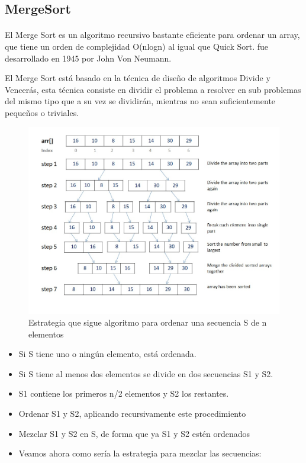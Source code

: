 \documentclass{article}
\begin{document}
     \subsection{MergeSort}
    \paragraph{}
    El Merge Sort es un algoritmo recursivo bastante eficiente para ordenar un array, que tiene un orden de complejidad O(nlogn) al igual que Quick Sort. fue desarrollado en 1945 por John Von Neumann.

    El Merge Sort está basado en la técnica de diseño de algoritmos Divide y Vencerás, esta técnica consiste en dividir el problema a resolver en sub problemas del mismo tipo que a su vez se dividirán, mientras no sean suficientemente  pequeños o triviales.
    \begin{figure}[h!]
        \centering
        \includegraphics[width=12cm]{img/mergesort.png}
        \caption{Estrategia que sigue algoritmo para ordenar una secuencia S de n elementos}
        \label{fig:mergesort}
    \end {figure}
    \begin{itemize}
        \item Si S tiene uno o ningún elemento, está ordenada.
        \item Si S tiene al menos dos elementos se divide en dos secuencias S1 y S2.
        \item S1 contiene los primeros n/2 elementos y S2 los restantes.
        \item Ordenar S1 y S2, aplicando recursivamente este procedimiento
        \item Mezclar S1 y S2 en S, de forma que ya S1 y S2 estén ordenados
        \item Veamos ahora como sería la estrategia para mezclar las secuencias:
    \end{itemize}
\end{document}
